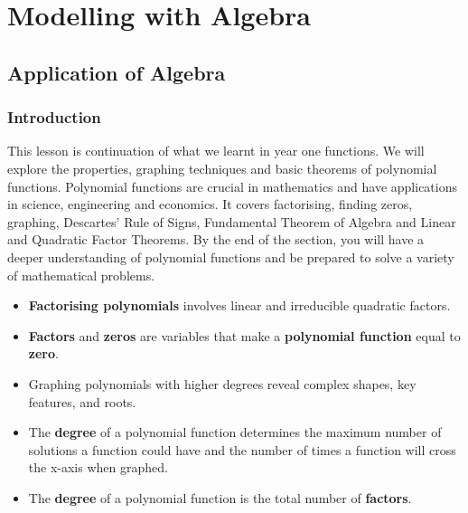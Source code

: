 \section*{Modelling with Algebra}
\subsection*{Application of Algebra}

\subsubsection*{Introduction}

This lesson is continuation of what we learnt in year one functions. We will
explore the properties, graphing techniques and basic theorems of polynomial
functions. Polynomial functions are crucial in mathematics and have applications
in science, engineering and economics. It covers factorising, finding zeros,
graphing, Descartes' Rule of Signs, Fundamental Theorem of Algebra and Linear
and Quadratic Factor Theorems. By the end of the section, you will have a deeper
understanding of polynomial functions and be prepared to solve a variety of
mathematical problems.

\begin{keyideas}
\begin{itemize}
  \item \textbf{Factorising polynomials} involves linear and irreducible quadratic
  factors.
  \item \textbf{Factors} and \textbf{zeros} are variables that make a
  \textbf{polynomial function} equal to \textbf{zero}.
  \item Graphing polynomials with higher degrees reveal complex shapes, key
  features, and roots.
  \item The \textbf{degree} of a polynomial function determines the maximum number
  of solutions a function could have and the number of times a function will
  cross the x-axis when graphed.
  \item The \textbf{degree} of a polynomial function is the total number of
  \textbf{factors}.
\end{itemize}
\end{keyideas}
